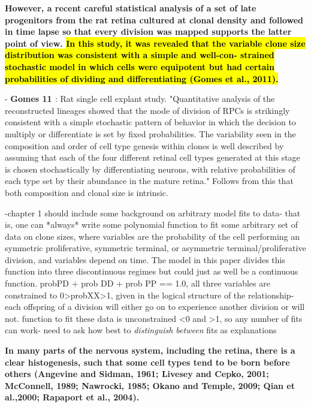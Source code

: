 \documentclass{ut-thesis}
\begin{document}
\bigskip

 \textbf{However, a recent careful statistical analysis of a set of late progenitors
from the rat retina cultured at clonal density and followed in
time lapse so that every division was mapped supports the latter
point of view. \hl{In this study, it was revealed that the variable clone
size distribution was consistent with a simple and well-con-
strained stochastic model in which cells were equipotent but
had certain probabilities of dividing and differentiating (Gomes
et al., 2011).}}

\bigskip

- \textbf{Gomes 11 \cite{Gomes2011}}: Rat single cell explant study. "Quantitative analysis of the reconstructed lineages showed that the mode of division of RPCs is strikingly consistent with a simple stochastic pattern of behavior in which the decision to multiply or differentiate is set by fixed probabilities. The variability seen in the composition and order of cell type genesis within clones is well described by assuming that each of the four different retinal cell types generated at this stage is chosen stochastically by differentiating neurons, with relative probabilities of each type set by
their abundance in the mature retina." Follows from this that both composition and clonal size is intrinsic.

-chapter 1 should include some background on arbitrary model fits to data- that is, one can *always* write some polynomial function to fit some arbitrary set of data on clone sizes, where variables are the probability of the cell performing an symmetric proliferative, symmetric terminal, or asymmetric terminal/proliferative division, and variables depend on time. The model in this paper divides this function into three discontinuous regimes but could just as well be a continuous function. probPD + prob DD + prob PP == 1.0, all three variables are constrained to 0>probXX>1, given in the logical structure of the relationship- each offspring of a division will either go on to experience another division or will not. function to fit these data is unconstrained <0 and >1, so any number of fits can work- need to ask how best to \textit{distinguish between} fits as explanations

\bigskip

\textbf{
In many parts of the nervous system, including the retina, there
is a clear histogenesis, such that some cell types tend to be born
before others (Angevine and Sidman, 1961; Livesey and Cepko,
2001; McConnell, 1989; Nawrocki, 1985; Okano and Temple,
2009; Qian et al.,2000; Rapaport et al., 2004).}
\end{document}
